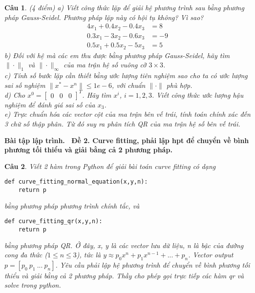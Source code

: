 \documentclass[11pt]{article}
\newtheorem{bt}{Câu}
\newcommand{\m}[1]{
	\begin{bmatrix}
		#1
	\end{bmatrix}
}
\begin{document}

\begin{bt}(4 điểm)
	a) Viết công thức lặp để giải hệ phương trình sau bằng phương pháp Gauss-Seidel. Phương pháp lặp này có hội tụ không? Vì sao?
	\begin{align*}
	4 x_1 + 0.4 x_2 - 0.4 x_3 &= 8 \\
	0.3 x_1 - 3 x_2 - 0.6 x_3 &= -9 \\
	0.5 x_1 + 0.5 x_2 - 5 x_3 &= 5 
	\end{align*}
	b) Đối với hệ mà các em thu được bằng phương pháp Gauss-Seidel, hãy tìm $\|\cdot\|_1$ và $\|\cdot\|_{\infty}$ của ma trận hệ số vuông cỡ $3 \times 3$. \\
	c) Tính số bước lặp cần thiết bằng ước lượng tiên nghiệm sao cho ta có ước lượng sai số nghiệm $\|x^*-x^n\| \leq 1e-6$, với chuẩn $\|\cdot\|$ phù hợp. \\
	d) Cho $x^0 = \m{0 & 0 & 0}^T$. Hãy tìm $x^i$, $i=1,2,3$. Viết công thức ước lượng hậu nghiệm để đánh giá sai số của $x_3$. \\
	e) Trực chuẩn hóa các vector cột của ma trận bên vế trái, tính toán chính xác đến 3 chữ số thập phân. Từ đó suy ra phân tích QR của ma trận hệ số bên vế trái.
\end{bt}

\cleardoublepage
\begin{center}
	\textbf{  Bài tập lập trình.  \ Đề 2. Curve fitting, phải lập hpt để chuyển về bình phương tối thiểu và giải bằng cả 2 phương pháp.}
\end{center}

\begin{bt}
	Viết 2 hàm trong Python để giải bài toán curve fitting có dạng
	\begin{lstlisting}[frame=single] 
	def curve_fitting_normal_equation(x,y,n):
	return p
	\end{lstlisting}
	bằng phương pháp phương trình chính tắc, và
	\begin{lstlisting}[frame=single] 
	def curve_fitting_qr(x,y,n):
	return p
	\end{lstlisting}
	bằng phương pháp QR. Ở đây, x, y là các vector lưu dữ liệu, n là bậc của đường cong đa thức ($1 \leq n\leq 3$), tức là $y \approx p_0 x^n+p_1 x^{n-1}+...+p_n$. Vector output $p=[p_0 \ p_1 \ ... \ p_n]$.	
	Yêu cầu phải lập hệ phương trình để chuyển về bình phương tối thiểu và giải bằng cả 2 phương pháp. Thầy cho phép gọi trực tiếp các hàm qr và solve trong python.
\end{bt}
\end{document}

